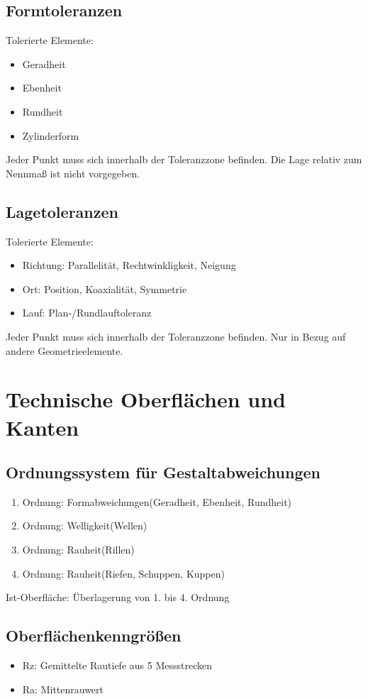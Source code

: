 \documentclass[a4paper,parskip=half*,DIV=7,fontsize=11pt]{scrartcl}
\begin{document}
\subsection{Formtoleranzen}
Tolerierte Elemente:
\begin{itemize}
	\item Geradheit
	\item Ebenheit
	\item Rundheit
	\item Zylinderform
\end{itemize}
Jeder Punkt muss sich innerhalb der Toleranzzone befinden. Die Lage relativ zum Nennmaß ist nicht vorgegeben.
	
\subsection{Lagetoleranzen}
Tolerierte Elemente:
\begin{itemize}
	\item Richtung: Parallelität, Rechtwinkligkeit, Neigung
	\item Ort: Position, Koaxialität, Symmetrie
	\item Lauf: Plan-/Rundlauftoleranz
\end{itemize}
Jeder Punkt muss sich innerhalb der Toleranzzone befinden. Nur in Bezug auf andere Geometrieelemente.
	
\section{Technische Oberflächen und Kanten}
\subsection{Ordnungssystem für Gestaltabweichungen}
\begin{enumerate}
	\item Ordnung: Formabweichungen(Geradheit, Ebenheit, Rundheit)
	\item Ordnung: Welligkeit(Wellen)
	\item Ordnung: Rauheit(Rillen)
	\item Ordnung: Rauheit(Riefen, Schuppen, Kuppen)
\end{enumerate}

Ist-Oberfläche: Überlagerung von 1. bis 4. Ordnung

\subsection{Oberflächenkenngrößen}
\begin{itemize}
	\item Rz: Gemittelte Rautiefe aus 5 Messstrecken 
	\item Ra: Mittenrauwert
\end{itemize}
	
\end{document}
